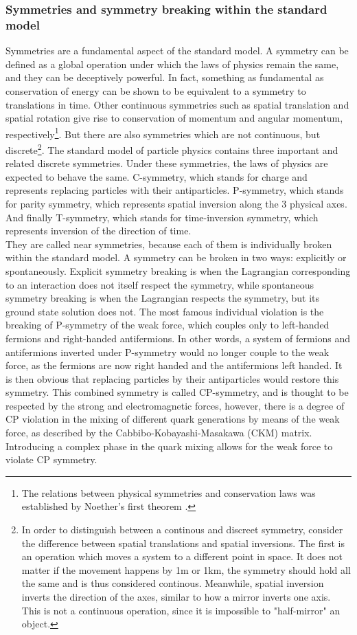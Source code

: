 \subsubsection{Symmetries and symmetry breaking within the standard model}\label{sec:IntroSymmetries}
Symmetries are a fundamental aspect of the standard model. A symmetry can be defined as a global operation under which the laws of physics remain the same, and they can be deceptively powerful. In fact, something as fundamental as conservation of energy can be shown to be equivalent to a symmetry to translations in time. Other continuous symmetries such as spatial translation and spatial rotation give rise to conservation of momentum and angular momentum, respectively\footnote{The relations between physical symmetries and conservation laws was established by Noether's first theorem \cite{Noether1918}. }. But there are also symmetries which are not continuous, but discrete\footnote{In order to distinguish between a continous and discreet symmetry, consider the difference between spatial translations and spatial inversions. The first is an operation which moves a system to a different point in space. It does not matter if the movement happens by 1m or 1km, the symmetry should hold all the same and is thus considered continous. Meanwhile, spatial inversion inverts the direction of the axes, similar to how a mirror inverts one axis. This is not a continuous operation, since it is impossible to "half-mirror" an object.}. The standard model of particle physics contains three important and related discrete symmetries\cite{}. Under these symmetries, the laws of physics are expected to behave the same. C-symmetry, which stands for charge and represents replacing particles with their antiparticles. P-symmetry, which stands for parity symmetry, which represents spatial inversion along the 3 physical axes. And finally T-symmetry, which stands for time-inversion symmetry, which represents inversion of the direction of time. \\

They are called near symmetries, because each of them is individually broken within the standard model. A symmetry can be broken in two ways: explicitly or spontaneously. Explicit symmetry breaking is when the Lagrangian corresponding to an interaction does not itself respect the symmetry, while spontaneous symmetry breaking is when the Lagrangian respects the symmetry, but its ground state solution does not. The most famous individual violation is the breaking of P-symmetry of the weak force, which couples only to left-handed fermions and right-handed antifermions. In other words, a system of fermions and antifermions inverted under P-symmetry would no longer couple to the weak force, as the fermions are now right handed and the antifermions left handed. It is then obvious that replacing particles by their antiparticles would restore this symmetry. This combined symmetry is called CP-symmetry, and is thought to be respected by the strong and electromagnetic forces, however, there is a degree of CP violation in the mixing of different quark generations by means of the weak force, as described by the Cabbibo-Kobayashi-Masakawa (CKM) matrix. Introducing a complex phase in the quark mixing allows for the weak force to violate CP symmetry\cite{}. 

